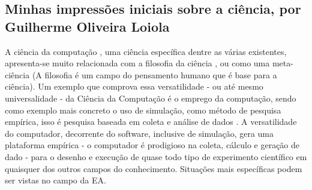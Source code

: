 \subsection{Minhas impressões iniciais sobre a ciência, por Guilherme Oliveira Loiola}

A ciência da computação \citep{baldwin_three-fold_1994}, uma ciência específica dentre as várias existentes, apresenta-se muito relacionada com a filosofia da ciência \citep{floridi_blackwell_2004}, ou como uma meta-ciência (A filosofia é um campo do pensamento humano que é base para a ciência). Um exemplo que comprova essa versatilidade - ou até mesmo universalidade - da Ciência da Computação é o emprego da computação, sendo como exemplo mais concreto o uso de simulação, como método de pesquisa empírica, isso é pesquisa baseada em coleta e análise de dados \citep{tedre_experiments_2014}. A versatilidade do computador, decorrente do software, inclusive de simulação, gera uma plataforma empírica - o computador é prodigioso na coleta, cálculo e geração de dado - para o desenho e execução de quase todo tipo de experimento científico em quaisquer dos outros campos do conhecimento. Situações mais específicas podem ser vistas no campo da \gls{EA}.
